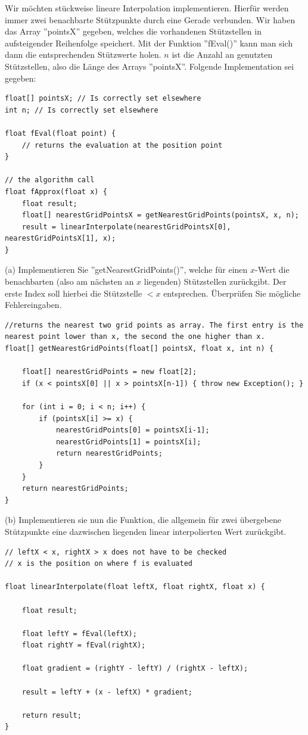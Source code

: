\documentclass{scrartcl}
\begin{document}
	Wir möchten stückweise lineare Interpolation implementieren. Hierfür werden immer zwei benachbarte Stützpunkte durch eine Gerade verbunden. 
	\n 
	Wir haben das Array ''pointsX'' gegeben, welches die vorhandenen Stützstellen in aufsteigender Reihenfolge speichert. Mit der Funktion ''fEval()'' kann man sich dann die entsprechenden Stützwerte holen. $n$ ist die Anzahl an genutzten Stützstellen, also die Länge des Arrays ''pointsX''.
	\n
	Folgende Implementation sei gegeben:
	\begin{lstlisting}
float[] pointsX; // Is correctly set elsewhere
int n; // Is correctly set elsewhere
	
float fEval(float point) {
	// returns the evaluation at the position point
}
	
// the algorithm call
float fApprox(float x) {
	float result;
	float[] nearestGridPointsX = getNearestGridPoints(pointsX, x, n);
	result = linearInterpolate(nearestGridPointsX[0], nearestGridPointsX[1], x);
}	
	\end{lstlisting}
	(a) Implementieren Sie ''getNearestGridPoints()'', welche für einen $x$-Wert die benachbarten (also am nächsten an $x$ liegenden) Stützstellen zurückgibt. Der erste Index soll hierbei die Stützstelle $< x$ entsprechen. 
	\n 
	Überprüfen Sie mögliche Fehlereingaben.
	\begin{lstlisting}
//returns the nearest two grid points as array. The first entry is the nearest point lower than x, the second the one higher than x.
float[] getNearestGridPoints(float[] pointsX, float x, int n) {
	
	float[] nearestGridPoints = new float[2];
	if (x < pointsX[0] || x > pointsX[n-1]) { throw new Exception(); }
	
	for (int i = 0; i < n; i++) {
		if (pointsX[i] >= x) {
			nearestGridPoints[0] = pointsX[i-1];
			nearestGridPoints[1] = pointsX[i];
			return nearestGridPoints;
		}
	}		
	return nearestGridPoints;
}
	\end{lstlisting}
	\newpage
	(b) Implementieren sie nun die Funktion, die allgemein für zwei übergebene Stützpunkte eine dazwischen liegenden linear interpolierten Wert zurückgibt.
	\begin{lstlisting}
// leftX < x, rightX > x does not have to be checked
// x is the position on where f is evaluated
	
float linearInterpolate(float leftX, float rightX, float x) {
	
	float result;
	
	float leftY = fEval(leftX);
	float rightY = fEval(rightX);
	
	float gradient = (rightY - leftY) / (rightX - leftX);
	
	result = leftY + (x - leftX) * gradient;
	
	return result;
}
	\end{lstlisting}
\end{document}
